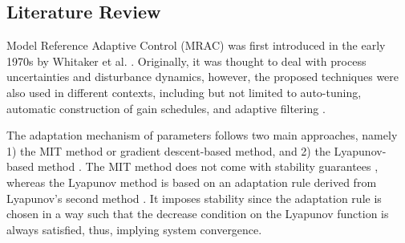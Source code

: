 \subsection{Literature Review}
\label{sec:related-work}
Model Reference Adaptive Control (MRAC) was first introduced in the early 1970s by Whitaker et al. \cite{whitakerDesignModelReference1958}. Originally, it was thought to deal with process uncertainties and disturbance dynamics, however, the proposed techniques were also used in different contexts, including but not limited to auto-tuning, automatic construction of gain schedules, and adaptive filtering \cite{astromTheoryApplicationsAdaptive1983, astromHistoryAdaptiveControl2014}.

The adaptation mechanism of parameters follows two main approaches, namely 1) the MIT method or gradient descent-based method, and 2) the Lyapunov-based method \cite{astromAdaptiveControl2008}. The MIT method does not come with stability guarantees \cite{mareelsRevisitingMitRule1987}, whereas the Lyapunov method is based on an adaptation rule derived from Lyapunov's second method \cite{shackclothSynthesisModelReference1965}. It imposes stability since the adaptation rule is chosen in a way such that the decrease condition on the Lyapunov function is always satisfied, thus, implying system convergence.



